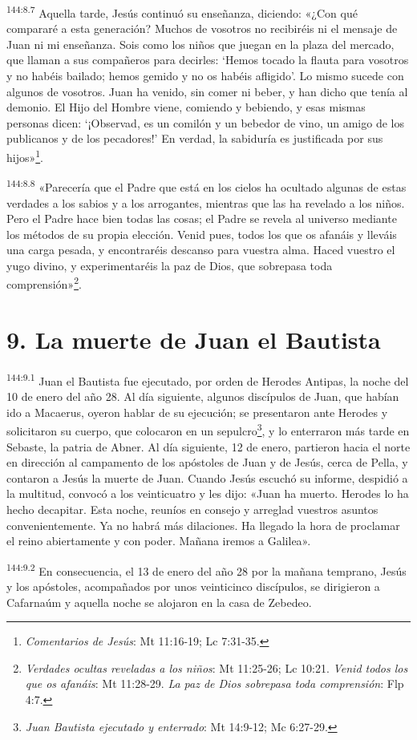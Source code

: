 \par 
\textsuperscript{144:8.7} Aquella tarde, Jesús continuó su enseñanza, diciendo: «¿Con qué compararé a esta generación? Muchos de vosotros no recibiréis ni el mensaje de Juan ni mi enseñanza. Sois como los niños que juegan en la plaza del mercado, que llaman a sus compañeros para decirles: `Hemos tocado la flauta para vosotros y no habéis bailado; hemos gemido y no os habéis afligido'. Lo mismo sucede con algunos de vosotros. Juan ha venido, sin comer ni beber, y han dicho que tenía al demonio. El Hijo del Hombre viene, comiendo y bebiendo, y esas mismas personas dicen: `¡Observad, es un comilón y un bebedor de vino, un amigo de los publicanos y de los pecadores!' En verdad, la sabiduría es justificada por sus hijos»\footnote{\textit{Comentarios de Jesús}: Mt 11:16-19; Lc 7:31-35.}.

\par 
\textsuperscript{144:8.8} «Parecería que el Padre que está en los cielos ha ocultado algunas de estas verdades a los sabios y a los arrogantes, mientras que las ha revelado a los niños. Pero el Padre hace bien todas las cosas; el Padre se revela al universo mediante los métodos de su propia elección. Venid pues, todos los que os afanáis y lleváis una carga pesada, y encontraréis descanso para vuestra alma. Haced vuestro el yugo divino, y experimentaréis la paz de Dios, que sobrepasa toda comprensión»\footnote{\textit{Verdades ocultas reveladas a los niños}: Mt 11:25-26; Lc 10:21. \textit{Venid todos los que os afanáis}: Mt 11:28-29. \textit{La paz de Dios sobrepasa toda comprensión}: Flp 4:7.}.

\section*{9. La muerte de Juan el Bautista}
\par 
\textsuperscript{144:9.1} Juan el Bautista fue ejecutado, por orden de Herodes Antipas, la noche del 10 de enero del año 28. Al día siguiente, algunos discípulos de Juan, que habían ido a Macaerus, oyeron hablar de su ejecución; se presentaron ante Herodes y solicitaron su cuerpo, que colocaron en un sepulcro\footnote{\textit{Juan Bautista ejecutado y enterrado}: Mt 14:9-12; Mc 6:27-29.}, y lo enterraron más tarde en Sebaste, la patria de Abner. Al día siguiente, 12 de enero, partieron hacia el norte en dirección al campamento de los apóstoles de Juan y de Jesús, cerca de Pella, y contaron a Jesús la muerte de Juan. Cuando Jesús escuchó su informe, despidió a la multitud, convocó a los veinticuatro y les dijo: «Juan ha muerto. Herodes lo ha hecho decapitar. Esta noche, reuníos en consejo y arreglad vuestros asuntos convenientemente. Ya no habrá más dilaciones. Ha llegado la hora de proclamar el reino abiertamente y con poder. Mañana iremos a Galilea».

\par 
\textsuperscript{144:9.2} En consecuencia, el 13 de enero del año 28 por la mañana temprano, Jesús y los apóstoles, acompañados por unos veinticinco discípulos, se dirigieron a Cafarnaúm y aquella noche se alojaron en la casa de Zebedeo.